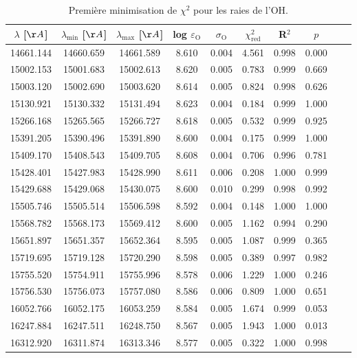 \begin{table}
\caption{Première minimisation de $\chi^2$ pour les raies de l'OH.}
\label{tab:resultats_OH}
\begin{center}
\begin{tabular}{cccccccccc}
\toprule
\hline
$\lambda$ [$\AA$] & $\lambda_{\mathrm{min}}$ [$\AA$] &$\lambda_{\mathrm{max}}$ [$\AA$] & log $\varepsilon_{\mathrm{O}}$ & $\sigma_{\mathrm{O}}$ & $\chi^2_{\mathrm{red}}$ & R$^2$ & $p$ \\
\midrule
14661.144 & 14660.659 & 14661.589 & 8.610 & 0.004 & 4.561 & 0.998 & 0.000 \\
15002.153 & 15001.683 & 15002.613 & 8.620 & 0.005 & 0.783 & 0.999 & 0.669 \\
15003.120 & 15002.690 & 15003.620 & 8.614 & 0.005 & 0.824 & 0.998 & 0.626 \\
15130.921 & 15130.332 & 15131.494 & 8.623 & 0.004 & 0.184 & 0.999 & 1.000 \\
15266.168 & 15265.565 & 15266.727 & 8.618 & 0.005 & 0.532 & 0.999 & 0.925 \\
15391.205 & 15390.496 & 15391.890 & 8.600 & 0.004 & 0.175 & 0.999 & 1.000 \\
15409.170 & 15408.543 & 15409.705 & 8.608 & 0.004 & 0.706 & 0.996 & 0.781 \\
15428.401 & 15427.983 & 15428.990 & 8.611 & 0.006 & 0.208 & 1.000 & 0.999 \\
15429.688 & 15429.068 & 15430.075 & 8.600 & 0.010 & 0.299 & 0.998 & 0.992 \\
15505.746 & 15505.514 & 15506.598 & 8.592 & 0.004 & 0.148 & 1.000 & 1.000 \\
15568.782 & 15568.173 & 15569.412 & 8.600 & 0.005 & 1.162 & 0.994 & 0.290 \\
15651.897 & 15651.357 & 15652.364 & 8.595 & 0.005 & 1.087 & 0.999 & 0.365 \\
15719.695 & 15719.128 & 15720.290 & 8.598 & 0.005 & 0.389 & 0.997 & 0.982 \\
15755.520 & 15754.911 & 15755.996 & 8.578 & 0.006 & 1.229 & 1.000 & 0.246 \\
15756.530 & 15756.073 & 15757.080 & 8.586 & 0.006 & 0.809 & 1.000 & 0.651 \\
16052.766 & 16052.175 & 16053.259 & 8.584 & 0.005 & 1.674 & 0.999 & 0.053 \\
16247.884 & 16247.511 & 16248.750 & 8.567 & 0.005 & 1.943 & 1.000 & 0.013 \\
16312.920 & 16311.874 & 16313.346 & 8.577 & 0.005 & 0.322 & 1.000 & 0.998 \\

\end{tabular}
\end{center}
\end{table}
